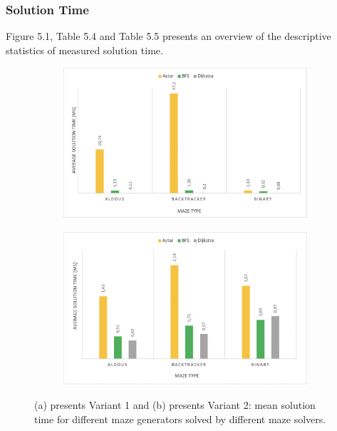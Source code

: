 \subsubsection{Solution Time}
Figure 5.1, Table 5.4 and Table 5.5 presents an overview of the descriptive statistics of measured solution time.\\
\begin{figure}[!h]
    \centering
    \begin{subfigure}[b]{0.7\textwidth}
        \centering
        \includegraphics[width=\textwidth]{averagetime_variant1.png}
        \caption{}
    \end{subfigure}
    \begin{subfigure}[b]{0.7\textwidth}  
        \centering 
        \includegraphics[width=\textwidth]{averagetime_variant2.png}
        \caption{}
    \end{subfigure}
    \caption[]{(a) presents Variant 1 and (b) presents Variant 2: mean solution time for different maze generators solved by different maze solvers.}
\end{figure}
